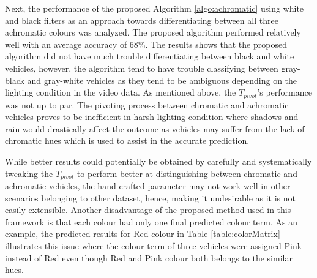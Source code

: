 Next, the performance of the proposed Algorithm \ref{algo:achromatic} using white and black filters as an approach towards differentiating between all three achromatic colours was analyzed. The proposed algorithm performed relatively well with an average accuracy of 68\%. The results shows that the proposed algorithm did not have much trouble differentiating between black and white vehicles, however, the algorithm tend to have trouble classifying between gray-black and gray-white vehicles as they tend to be ambiguous depending on the lighting condition in the video data. As mentioned above, the $T_{pivot}$'s performance was not up to par. The pivoting process between chromatic and achromatic vehicles proves to be inefficient in harsh lighting condition where shadows and rain would drastically affect the outcome as vehicles may suffer from the lack of chromatic hues which is used to assist in the accurate prediction.

While better results could potentially be obtained by carefully and systematically tweaking the $T_{pivot}$ to perform better at distinguishing between chromatic and achromatic vehicles, the hand crafted parameter may not work well in other scenarios belonging to other dataset, hence, making it undesirable as it is not easily extensible. Another disadvantage of the proposed method used in this framework is that each colour had only one final predicted colour term. As an example, the predicted results for Red colour in Table \ref{table:colorMatrix} illustrates this issue where the colour term of three vehicles were assigned Pink instead of Red even though Red and Pink colour both belongs to the similar hues. 


